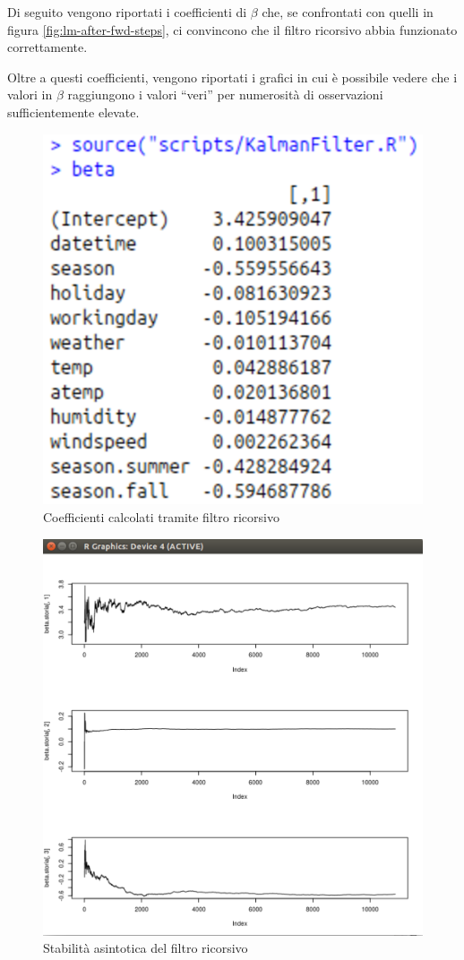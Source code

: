 Di seguito vengono riportati i coefficienti di $ \beta{} $ che, se confrontati
con quelli in figura \ref{fig:lm-after-fwd-steps}, ci convincono che il filtro
ricorsivo abbia funzionato correttamente.

Oltre a questi coefficienti, vengono riportati i grafici in cui è possibile
vedere che i valori in $ \beta{} $ raggiungono i valori ``veri'' per numerosità
di osservazioni sufficientemente elevate.

\begin{figure}[H]
  \centering
  \includegraphics[width=.55\columnwidth]{images/kalman-beta.eps}
  \caption{Coefficienti calcolati tramite filtro ricorsivo}
    \label{fig:kalman-beta}
\end{figure}

\begin{figure}[H]
  \centering
  \includegraphics[width=.55\columnwidth]{images/kalman-asymptotic.eps}
  \caption{Stabilità asintotica del filtro ricorsivo}
    \label{fig:kalman-asymptotic}
\end{figure}
